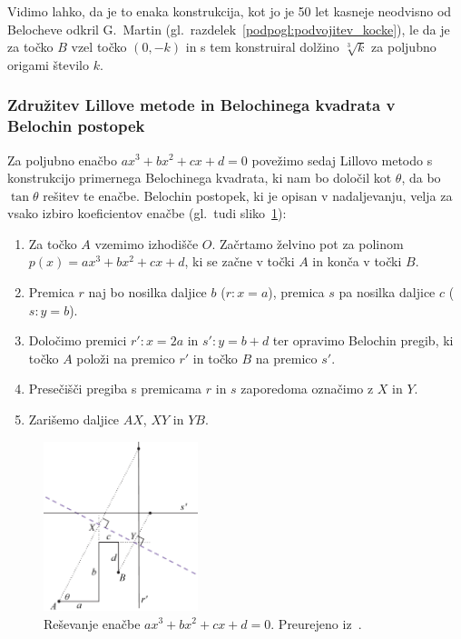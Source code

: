 Vidimo lahko, da je to enaka konstrukcija, kot jo je 50 let kasneje neodvisno od Belocheve odkril G.\ Martin (gl.\ razdelek~\ref{podpogl:podvojitev_kocke}), le da je za točko $B$ vzel točko $(0, -k)$ in s tem konstruiral dolžino $\sqrt[3]{k}$ za poljubno origami število $k$.

\subsubsection*{Združitev Lillove metode in Belochinega kvadrata v Belochin postopek}
\label{podpogl:lill_beloch_postopek}

Za poljubno enačbo $a x^3 + b x^2 + c x + d = 0$ povežimo sedaj Lillovo metodo s konstrukcijo primernega Belochinega kvadrata, ki nam bo določil kot $\theta$, da bo $\tan \theta$ rešitev te enačbe. Belochin postopek, ki je opisan v nadaljevanju, velja za vsako izbiro koeficientov enačbe (gl.\ tudi sliko~\ref{fig:beloch_kubicna_resitev}):

\begin{enumerate}
    \item Za točko $A$ vzemimo izhodišče $O$. Začrtamo želvino pot za polinom $p(x) = a x^3 + b x^2 + c x + d$, ki se začne v točki $A$ in konča v točki $B$.
    \item Premica $r$ naj bo nosilka daljice $b$ ($r: x = a$), premica $s$ pa nosilka daljice $c$ ($s: y = b$).
    \item Določimo premici $r': x = 2a$ in $s': y = b + d$ ter opravimo Belochin pregib, ki točko $A$ položi na premico $r'$ in točko $B$ na premico $s'$.
    \item Presečišči pregiba s premicama $r$ in $s$ zaporedoma označimo z $X$ in $Y$.
    \item Zarišemo daljice $AX$, $XY$ in $YB$.
\end{enumerate}

\begin{figure}[h]
    \centering
    \includegraphics[width=0.4\textwidth]{images/kubična enačba/beloch_kubicna_resitev.png}
    \caption[Lillova metoda z Belochinim kvadratom]{Reševanje enačbe $a x^3 + b x^2 + c x + d = 0$. Preurejeno iz~\cite[str.\ 42]{hull2020}.}
    \label{fig:beloch_kubicna_resitev}
\end{figure}

